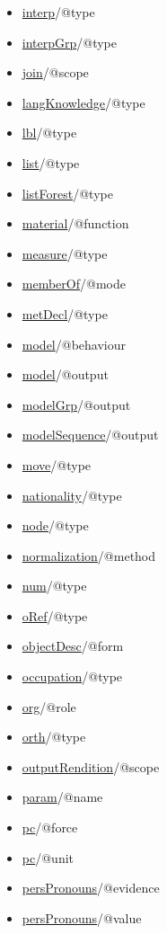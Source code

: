 \begin{reflist}
\begin{itemize}
\item \hyperref[TEI.interp]{interp}/@type
\item \hyperref[TEI.interpGrp]{interpGrp}/@type
\item \hyperref[TEI.join]{join}/@scope
\item \hyperref[TEI.langKnowledge]{langKnowledge}/@type
\item \hyperref[TEI.lbl]{lbl}/@type
\item \hyperref[TEI.list]{list}/@type
\item \hyperref[TEI.listForest]{listForest}/@type
\item \hyperref[TEI.material]{material}/@function
\item \hyperref[TEI.measure]{measure}/@type
\item \hyperref[TEI.memberOf]{memberOf}/@mode
\item \hyperref[TEI.metDecl]{metDecl}/@type
\item \hyperref[TEI.model]{model}/@behaviour
\item \hyperref[TEI.model]{model}/@output
\item \hyperref[TEI.modelGrp]{modelGrp}/@output
\item \hyperref[TEI.modelSequence]{modelSequence}/@output
\item \hyperref[TEI.move]{move}/@type
\item \hyperref[TEI.nationality]{nationality}/@type
\item \hyperref[TEI.node]{node}/@type
\item \hyperref[TEI.normalization]{normalization}/@method
\item \hyperref[TEI.num]{num}/@type
\item \hyperref[TEI.oRef]{oRef}/@type
\item \hyperref[TEI.objectDesc]{objectDesc}/@form
\item \hyperref[TEI.occupation]{occupation}/@type
\item \hyperref[TEI.org]{org}/@role
\item \hyperref[TEI.orth]{orth}/@type
\item \hyperref[TEI.outputRendition]{outputRendition}/@scope
\item \hyperref[TEI.param]{param}/@name
\item \hyperref[TEI.pc]{pc}/@force
\item \hyperref[TEI.pc]{pc}/@unit
\item \hyperref[TEI.persPronouns]{persPronouns}/@evidence
\item \hyperref[TEI.persPronouns]{persPronouns}/@value

\end{itemize}
\end{reflist}
